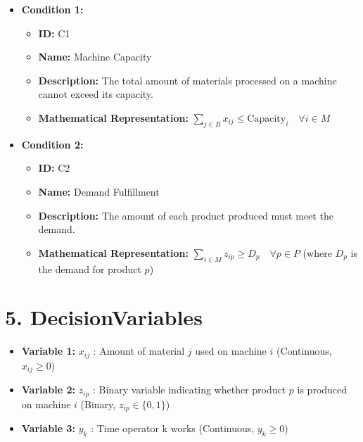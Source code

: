 \documentclass{article}
\begin{document}
\begin{itemize}
    \item \textbf{Condition 1:}
        \begin{itemize}
            \item \textbf{ID:} C1
            \item \textbf{Name:} Machine Capacity
            \item \textbf{Description:} The total amount of materials processed on a machine cannot exceed its capacity.
            \item \textbf{Mathematical Representation:} $\sum_{j \in R} x_{ij} \leq \text{Capacity}_i \quad \forall i \in M$
        \end{itemize}
    \item \textbf{Condition 2:}
        \begin{itemize}
            \item \textbf{ID:} C2
            \item \textbf{Name:} Demand Fulfillment
            \item \textbf{Description:} The amount of each product produced must meet the demand.
            \item \textbf{Mathematical Representation:} $\sum_{i \in M} z_{ip} \geq D_p \quad \forall p \in P$ (where $D_p$ is the demand for product $p$)
        \end{itemize}
\end{itemize}

\section{5. DecisionVariables}

\begin{itemize}
    \item \textbf{Variable 1:} $x_{ij}$ : Amount of material $j$ used on machine $i$ (Continuous, $x_{ij} \geq 0$)
    \item \textbf{Variable 2:} $z_{ip}$ : Binary variable indicating whether product $p$ is produced on machine $i$ (Binary, $z_{ip} \in \{0, 1\}$)
    \item \textbf{Variable 3:} $y_k$ : Time operator k works (Continuous, $y_k \geq 0$)
\end{itemize}
\end{document}
